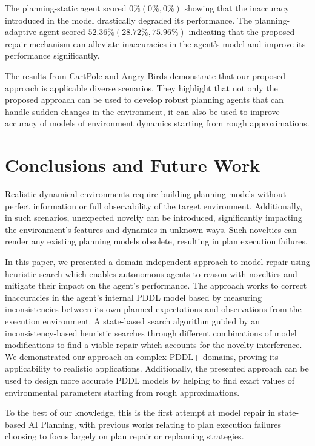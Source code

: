 \documentclass[letterpaper]{article} %
\begin{document}
The planning-static agent scored $0\% (0\%, 0\%)$ showing that the inaccuracy introduced in the model drastically degraded its performance. The planning-adaptive agent scored $52.36\% (28.72\%, 75.96\%)$ indicating that the proposed repair mechanism can alleviate inaccuracies in the agent's model and improve its performance significantly.


The results from CartPole and Angry Birds demonstrate that our proposed approach is applicable diverse scenarios. They highlight that not only the proposed approach can be used to develop robust planning agents that can handle sudden changes in the environment, it can also be used to improve accuracy of models of environment dynamics starting from rough approximations.

\vspace{-0.90mm}
\section{Conclusions and Future Work}
Realistic dynamical environments require building planning models without perfect information or full observability of the target environment. Additionally, in such scenarios, unexpected novelty can be introduced, significantly impacting the environment's features and dynamics in unknown ways. Such novelties can render any existing planning models obsolete, resulting in plan execution failures.


In this paper, we presented a domain-independent approach to model repair using heuristic search which enables autonomous agents to reason with novelties and mitigate their impact on the agent's performance. The approach works to correct inaccuracies in the agent's internal PDDL model based by measuring inconsistencies between its own planned expectations and observations from the execution environment. A state-based search algorithm guided by an inconsistency-based heuristic searches through different combinations of model modifications to find a viable repair which accounts for the novelty interference. We demonstrated our approach on complex PDDL+ domains, proving its applicability to realistic applications. Additionally, the presented approach can be used to design more accurate PDDL models by helping to find exact values of environmental parameters starting from rough approximations.

To the best of our knowledge, this is the first attempt at model repair in state-based AI Planning, with previous works relating to plan execution failures choosing to focus largely on plan repair or replanning strategies.
\end{document}
